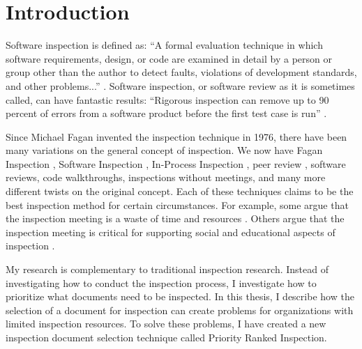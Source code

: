 

\chapter{Introduction}
Software inspection is defined as: ``A formal evaluation technique in which
software requirements, design, or code are examined in detail by a person
or group other than the author to detect faults, violations of development
standards, and other problems...'' \cite{Gilb93}. Software inspection, or
software review as it is sometimes called, can have fantastic results:
``Rigorous inspection can remove up to 90 percent of errors from a software
product before the first test case is run'' \cite{Glass03, Bush90}.

Since Michael Fagan invented the inspection technique in 1976, there have
been many variations on the general concept of inspection. We now have
Fagan Inspection \cite{Fagan76}, Software Inspection \cite{Gilb93},
In-Process Inspection \cite{Strauss94}, peer review \cite{Wiegers01},
software reviews, code walkthroughs, inspections without meetings, and many
more different twists on the original concept. Each of these techniques
claims to be the best inspection method for certain circumstances. For
example, some argue that the inspection meeting is a waste of time and
resources \cite{Johnson97, Votta93}. Others argue that the inspection
meeting is critical for supporting social and educational aspects of
inspection \cite{Gilb98, Gilb99, Johnson98, Johnson98a}.

My research is complementary to traditional inspection research. Instead
of investigating how to conduct the inspection process, I investigate how
to prioritize what documents need to be inspected. In this thesis, I
describe how the selection of a document for inspection can create problems
for organizations with limited inspection resources. To solve these
problems, I have created a new inspection document selection technique
called Priority Ranked Inspection.


